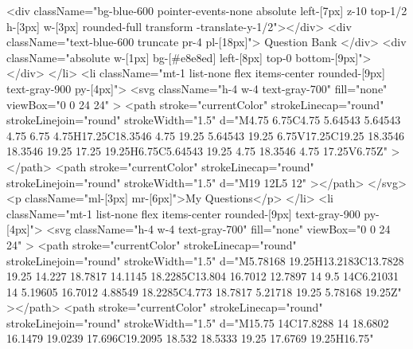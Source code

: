 {{{{                    <div className="bg-blue-600 pointer-events-none absolute left-[7px] z-10 top-1/2 h-[3px] w-[3px] rounded-full transform -translate-y-1/2"></div>
                    <div className="text-blue-600 truncate pr-4 pl-[18px]">
                      Question Bank
                    </div>
                    <div className="absolute w-[1px] bg-[#e8e8ed] left-[8px] top-0 bottom-[9px]"></div>
                  </li>
                  <li className="mt-1 list-none flex items-center rounded-[9px] text-gray-900 py-[4px]">
                    <svg
                      className="h-4 w-4 text-gray-700"
                      fill="none"
                      viewBox="0 0 24 24"
                    >
                      <path
                        stroke="currentColor"
                        strokeLinecap="round"
                        strokeLinejoin="round"
                        strokeWidth="1.5"
                        d="M4.75 6.75C4.75 5.64543 5.64543 4.75 6.75 4.75H17.25C18.3546 4.75 19.25 5.64543 19.25 6.75V17.25C19.25 18.3546 18.3546 19.25 17.25 19.25H6.75C5.64543 19.25 4.75 18.3546 4.75 17.25V6.75Z"
                      ></path>
                      <path
                        stroke="currentColor"
                        strokeLinecap="round"
                        strokeLinejoin="round"
                        strokeWidth="1.5"
                        d="M19 12L5 12"
                      ></path>
                    </svg>
                    <p className="ml-[3px] mr-[6px]">My Questions</p>
                  </li>
                  <li className="mt-1 list-none flex items-center rounded-[9px] text-gray-900 py-[4px]">
                    <svg
                      className="h-4 w-4 text-gray-700"
                      fill="none"
                      viewBox="0 0 24 24"
                    >
                      <path
                        stroke="currentColor"
                        strokeLinecap="round"
                        strokeLinejoin="round"
                        strokeWidth="1.5"
                        d="M5.78168 19.25H13.2183C13.7828 19.25 14.227 18.7817 14.1145 18.2285C13.804 16.7012 12.7897 14 9.5 14C6.21031 14 5.19605 16.7012 4.88549 18.2285C4.773 18.7817 5.21718 19.25 5.78168 19.25Z"
                      ></path>
                      <path
                        stroke="currentColor"
                        strokeLinecap="round"
                        strokeLinejoin="round"
                        strokeWidth="1.5"
                        d="M15.75 14C17.8288 14 18.6802 16.1479 19.0239 17.696C19.2095 18.532 18.5333 19.25 17.6769 19.25H16.75"
}}}}
